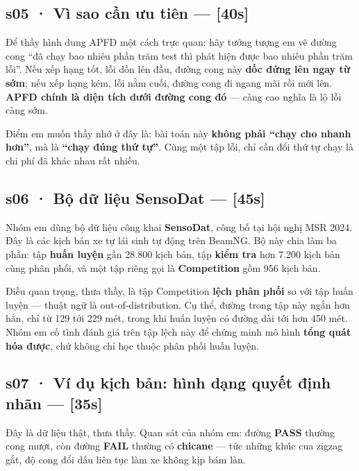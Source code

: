 \documentclass[
  11pt,
]{article}
\begin{document}
\subsection{s05 · Vì sao cần ưu tiên ---
{[}40s{]}}\label{s05-vuxec-sao-cux1ea7n-ux1b0u-tiuxean-40s}

Để thầy hình dung APFD một cách trực quan: hãy tưởng tượng em vẽ đường
cong ``đã chạy bao nhiêu phần trăm test thì phát hiện được bao nhiêu
phần trăm lỗi''. Nếu xếp hạng tốt, lỗi dồn lên đầu, đường cong này
\textbf{dốc đứng lên ngay từ sớm}; nếu xếp hạng kém, lỗi nằm cuối, đường
cong đi ngang mãi rồi mới lên. \textbf{APFD chính là diện tích dưới
đường cong đó} --- càng cao nghĩa là lộ lỗi càng sớm.

Điểm em muốn thầy nhớ ở đây là: bài toán này \textbf{không phải ``chạy
cho nhanh hơn''}, mà là \textbf{``chạy đúng thứ tự''}. Cùng một tập lỗi,
chỉ cần đổi thứ tự chạy là chi phí đã khác nhau rất nhiều.

\subsection{s06 · Bộ dữ liệu SensoDat ---
{[}45s{]}}\label{s06-bux1ed9-dux1eef-liux1ec7u-sensodat-45s}

Nhóm em dùng bộ dữ liệu công khai \textbf{SensoDat}, công bố tại hội
nghị MSR 2024. Đây là các kịch bản xe tự lái sinh tự động trên BeamNG.
Bộ này chia làm ba phần: tập \textbf{huấn luyện} gần 28.800 kịch bản,
tập \textbf{kiểm tra} hơn 7.200 kịch bản cùng phân phối, và một tập
riêng gọi là \textbf{Competition} gồm 956 kịch bản.

Điều quan trọng, thưa thầy, là tập Competition \textbf{lệch phân phối}
so với tập huấn luyện --- thuật ngữ là out-of-distribution. Cụ thể,
đường trong tập này ngắn hơn hẳn, chỉ từ 129 tới 229 mét, trong khi huấn
luyện có đường dài tới hơn 450 mét. Nhóm em cố tình đánh giá trên tập
lệch này để chứng minh mô hình \textbf{tổng quát hóa được}, chứ không
chỉ học thuộc phân phối huấn luyện.

\subsection{s07 · Ví dụ kịch bản: hình dạng quyết định nhãn ---
{[}35s{]}}\label{s07-vuxed-dux1ee5-kux1ecbch-bux1ea3n-huxecnh-dux1ea1ng-quyux1ebft-ux111ux1ecbnh-nhuxe3n-35s}

Đây là dữ liệu thật, thưa thầy. Quan sát của nhóm em: đường
\textbf{PASS} thường cong mượt, còn đường \textbf{FAIL} thường có
\textbf{chicane} --- tức những khúc cua zigzag gắt, độ cong đổi dấu liên
tục làm xe không kịp bám làn.
\end{document}
